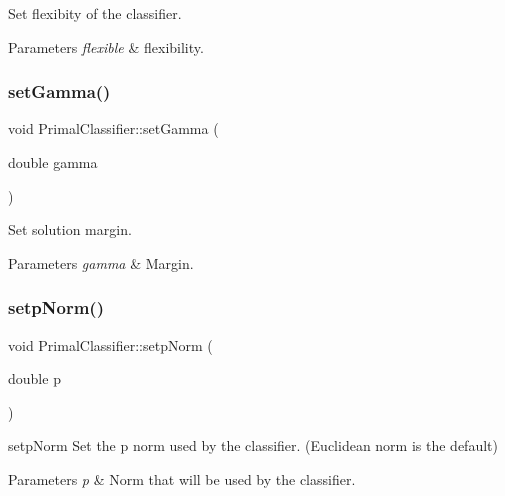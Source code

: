 Set flexibity of the classifier. 


\begin{DoxyParams}{Parameters}
{\em flexible} & flexibility. \\
\hline
\end{DoxyParams}
\mbox{\label{class_primal_classifier_a2d1443916a530c9b3729fb748097db50}} 
\subsubsection{\texorpdfstring{set\+Gamma()}{setGamma()}}
{\footnotesize\ttfamily void Primal\+Classifier\+::set\+Gamma (\begin{DoxyParamCaption}\item[{double}]{gamma }\end{DoxyParamCaption})}



Set solution margin. 


\begin{DoxyParams}{Parameters}
{\em gamma} & Margin. \\
\hline
\end{DoxyParams}
\mbox{\label{class_primal_classifier_a30cd3926ea5e7341920dcb5480567af1}} 
\subsubsection{\texorpdfstring{setp\+Norm()}{setpNorm()}}
{\footnotesize\ttfamily void Primal\+Classifier\+::setp\+Norm (\begin{DoxyParamCaption}\item[{double}]{p }\end{DoxyParamCaption})}



setp\+Norm Set the p norm used by the classifier. (Euclidean norm is the default) 


\begin{DoxyParams}{Parameters}
{\em p} & Norm that will be used by the classifier. \\
\hline
\end{DoxyParams}
\mbox{\label{class_primal_classifier_a22ca554e2a8d33d43c813b6b9b3e4a6a}} 
